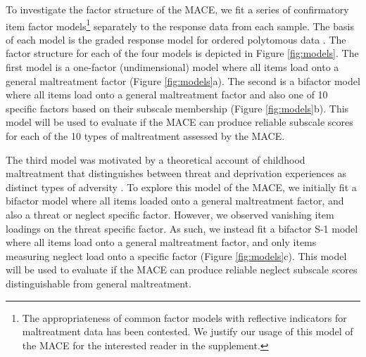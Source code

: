 \documentclass[letterpaper,man,natbib,noextraspace,floatsintext,longtable]{apa6}
\begin{document}
To investigate the factor structure of the MACE, we fit a series of confirmatory item factor models\footnote{The appropriateness of common factor models with reflective indicators for maltreatment data has been contested. We justify our usage of this model of the MACE for the interested reader in the supplement.} separately to the response data from each sample. The basis of each model is the graded response model for ordered polytomous data \citep{samejima1997graded}. The factor structure for each of the four models is depicted in Figure \ref{fig:models}. The first model is a one-factor (undimensional) model where all items load onto a general maltreatment factor (Figure \ref{fig:models}a). The second is a bifactor model where all items load onto a general maltreatment factor and also one of 10 specific factors based on their subscale membership (Figure \ref{fig:models}b). This model will be used to evaluate if the MACE can produce reliable subscale scores for each of the 10 types of maltreatment assessed by the MACE. 

The third model was motivated by a theoretical account of childhood maltreatment that distinguishes between threat and deprivation experiences as distinct types of adversity \citep{mclaughlin2014childhood}. To explore this model of the MACE, we initially fit a bifactor model where all items loaded onto a general maltreatment factor, and also a threat or neglect specific factor. However, we observed vanishing item loadings on the threat specific factor. As such, we instead fit a bifactor S-1 model \citep{eid2017anomalous} where all items load onto a general maltreatment factor, and only items measuring neglect load onto a specific factor (Figure \ref{fig:models}c). This model will be used to evaluate if the MACE can produce reliable neglect subscale scores distinguishable from general maltreatment. 
\end{document}
